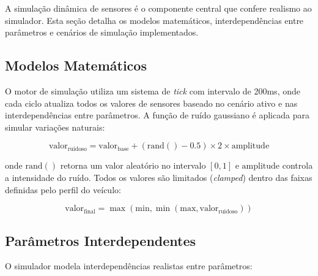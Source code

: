 A simulação dinâmica de sensores é o componente central que confere realismo ao simulador. Esta seção detalha os modelos matemáticos, interdependências entre parâmetros e cenários de simulação implementados.

\subsection{Modelos Matemáticos}

O motor de simulação utiliza um sistema de \textit{tick} com intervalo de 200ms, onde cada ciclo atualiza todos os valores de sensores baseado no cenário ativo e nas interdependências entre parâmetros. A função de ruído gaussiano é aplicada para simular variações naturais:

\begin{equation}
\text{valor}_{\text{ruidoso}} = \text{valor}_{\text{base}} + (\text{rand}() - 0.5) \times 2 \times \text{amplitude}
\label{eq:ruido}
\end{equation}

onde $\text{rand}()$ retorna um valor aleatório no intervalo $[0, 1]$ e $\text{amplitude}$ controla a intensidade do ruído. Todos os valores são limitados (\textit{clamped}) dentro das faixas definidas pelo perfil do veículo:

\begin{equation}
\text{valor}_{\text{final}} = \max(\text{min}, \min(\text{max}, \text{valor}_{\text{ruidoso}}))
\label{eq:clamp}
\end{equation}

\subsection{Parâmetros Interdependentes}

O simulador modela interdependências realistas entre parâmetros:

